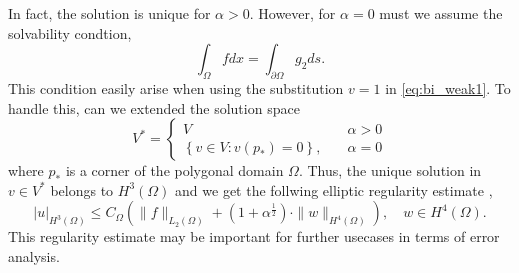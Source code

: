  In fact, the solution is unique for $\alpha  > 0$. However, for $\alpha  = 0$ must we assume the solvability condtion,
\begin{equation*}
 \int_{\Omega }^{} f dx = \int_{\partial \Omega }^{} g_{2} ds
.\end{equation*}
This condition easily arise when using the substitution $v=1$ in \eqref{eq:bi_weak1}. To handle this, can we extended the solution space \[
V^{*} = \begin{cases}
    V \quad & \alpha  > 0 \\
    \left\{ v \in V: v\left( p_{*} \right)  = 0\right\}, \quad & \alpha  = 0
\end{cases}
\]
where $p_{*}$ is a corner of the polygonal domain $\Omega $.
Thus, the unique solution in $v \in V^{*}$ belongs to $H^{3 }\left( \Omega  \right) $ and we get the follwing
elliptic regularity estimate \cite{gu2012c0},
\begin{equation}
\label{eq:bi_harmonic_ellitpic_regularity}
\left| u \right| _{H^{3 }\left( \Omega  \right) }  \le C_{\Omega } \left( \| f \|_{  L_{2}( \Omega ) }^{  } + ( 1 + \alpha  ^{\frac{1}{2}}
) \cdot \| w  \|_{ H^{4}\left( \Omega  \right)  }^{  }    \right), \quad w\in H^{4}\left( \Omega  \right).
\end{equation}
This regularity estimate may be important for further usecases in terms of error analysis.

